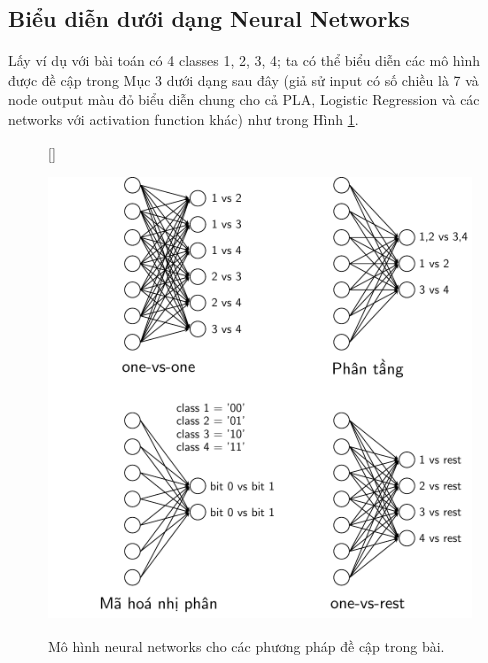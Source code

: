  
 
 
 
 
\subsection{Biểu diễn dưới dạng Neural Networks}
Lấy ví dụ với bài toán có 4 classes 1, 2, 3, 4; ta có thể biểu diễn các mô hình được đề cập trong Mục 3 dưới dạng sau đây (giả sử input có số chiều là 7 và node output màu đỏ biểu diễn chung cho cả PLA, Logistic Regression và các networks với activation function khác) như trong Hình \ref{fig:12_6}.
 

\begin{figure}[t]
    [\FBwidth]
    {\caption{ 
    Mô hình neural networks cho các phương pháp đề cập trong bài.
    }
    \label{fig:12_6}}
    { %
    \includegraphics[width=.75\textwidth]{Chapters/05_NeuralNetworks/12_binaryclassifiers/latex/binaryclassifiers.pdf}
    }
\end{figure}

